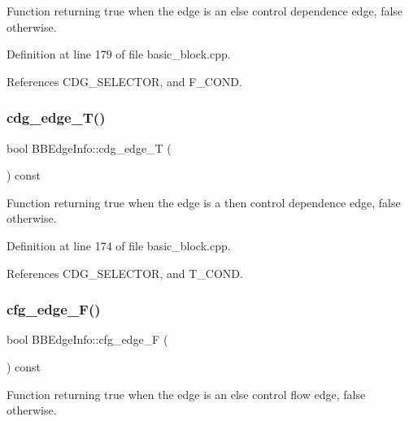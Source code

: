 Function returning true when the edge is an else control dependence edge, false otherwise. 



Definition at line 179 of file basic\+\_\+block.\+cpp.



References C\+D\+G\+\_\+\+S\+E\+L\+E\+C\+T\+OR, and F\+\_\+\+C\+O\+ND.

\mbox{\label{structBBEdgeInfo_a250632a2543325c808559a199b3552a9}} 
\subsubsection{\texorpdfstring{cdg\+\_\+edge\+\_\+\+T()}{cdg\_edge\_T()}}
{\footnotesize\ttfamily bool B\+B\+Edge\+Info\+::cdg\+\_\+edge\+\_\+T (\begin{DoxyParamCaption}{ }\end{DoxyParamCaption}) const}



Function returning true when the edge is a then control dependence edge, false otherwise. 



Definition at line 174 of file basic\+\_\+block.\+cpp.



References C\+D\+G\+\_\+\+S\+E\+L\+E\+C\+T\+OR, and T\+\_\+\+C\+O\+ND.

\mbox{\label{structBBEdgeInfo_a90a861e333cb2d342579b7a4449ee4fd}} 
\subsubsection{\texorpdfstring{cfg\+\_\+edge\+\_\+\+F()}{cfg\_edge\_F()}}
{\footnotesize\ttfamily bool B\+B\+Edge\+Info\+::cfg\+\_\+edge\+\_\+F (\begin{DoxyParamCaption}{ }\end{DoxyParamCaption}) const}



Function returning true when the edge is an else control flow edge, false otherwise. 




